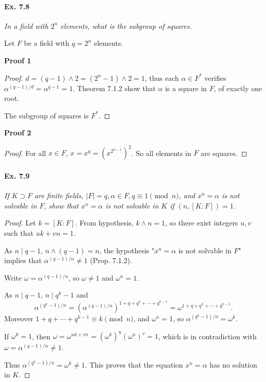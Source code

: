 \documentclass[11pt,a4paper]{article}
\begin{document}
\paragraph{Ex. 7.8}

{\it  In a field with $2^n$ elements, what is the subgroup of squares.
}

\bigskip

Let $F$ be a field with $q = 2^n$ elements. 

\bigskip

{\bf Proof 1}
\begin{proof}
$d = (q-1) \wedge 2 = (2^n - 1) \wedge 2 = 1$, thus each $\alpha \in F^*$ verifies $\alpha^{(q-1)/d} = \alpha^{q-1} = 1$. Theorem 7.1.2 show that $\alpha$ is a square in $F$, of exactly one root.

The subgroup of squares is $F^*$.
\end{proof}

{\bf Proof 2}
\begin{proof}
For all $x \in F$, $x = x^q = \left (x^{2^{n-1}}\right)^2$. So all elements in $F$ are squares. 
\end{proof}

\paragraph{Ex. 7.9}

{\it If $K \supset F$ are finite fields, $\vert F \vert = q, \alpha \in F, q\equiv 1 \pmod n$, and $x^n = \alpha$ is not solvable in $F$, show that $x^n = \alpha$ is not solvable in $K$ if $(n,[K:F]) = 1$.
}

\begin{proof}
Let $k = [K:F]$. From hypothesis, $k\wedge n = 1$, so there exist integers $u,v$ such that $uk+vn = 1$.

As $n \mid q-1$, $n \wedge (q-1) = n$, the hypothesis "$x^n = \alpha$ is not solvable in $F$" implies that $\alpha^{(q-1)/n} \neq 1$ (Prop. 7.1.2).

Write $\omega =\alpha^{(q-1)/n}$, so $\omega \ne 1$ and $\omega^n = 1$.

As $n \mid q-1$, $n \mid q^k - 1$ and
$$\alpha^{(q^k-1)/n} = (\alpha^{(q-1)/n})^{1+q+q^2+\cdots+q^{k-1}} =  \omega^{1+q+q^2+\cdots+q^{k-1}}.$$
Moreover $1+q+\cdots+q^{k-1} \equiv k \pmod n$, and $\omega^n = 1$, so $\alpha^{(q^k-1)/n} = \omega^k$.

If $\omega^k = 1$, then $\omega = \omega^{uk+vn} = (\omega^k)^u (\omega^n)^v = 1$, which is in contradiction with $\omega = \alpha^{(q-1)/n} \ne 1$.

Thus $\alpha^{(q^k-1)/n} = \omega^k \ne 1$. This proves that the equation $x^n = \alpha$ has no solution in $K$.
\end{proof}
\end{document}
